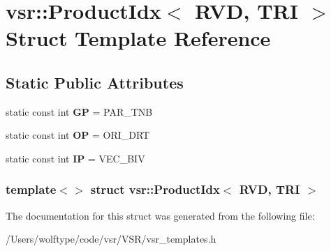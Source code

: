\hypertarget{structvsr_1_1_product_idx_3_01_r_v_d_00_01_t_r_i_01_4}{\section{vsr\-:\-:Product\-Idx$<$ R\-V\-D, T\-R\-I $>$ Struct Template Reference}
\label{structvsr_1_1_product_idx_3_01_r_v_d_00_01_t_r_i_01_4}
}
\subsection*{Static Public Attributes}
\begin{DoxyCompactItemize}
\item 
\hypertarget{structvsr_1_1_product_idx_3_01_r_v_d_00_01_t_r_i_01_4_adc46ffcfe6981c59f0d8f07e973c303c}{static const int {\bfseries G\-P} = P\-A\-R\-\_\-\-T\-N\-B}\label{structvsr_1_1_product_idx_3_01_r_v_d_00_01_t_r_i_01_4_adc46ffcfe6981c59f0d8f07e973c303c}

\item 
\hypertarget{structvsr_1_1_product_idx_3_01_r_v_d_00_01_t_r_i_01_4_ae7aa5ce81b28eb7d9a2a3931716cccc6}{static const int {\bfseries O\-P} = O\-R\-I\-\_\-\-D\-R\-T}\label{structvsr_1_1_product_idx_3_01_r_v_d_00_01_t_r_i_01_4_ae7aa5ce81b28eb7d9a2a3931716cccc6}

\item 
\hypertarget{structvsr_1_1_product_idx_3_01_r_v_d_00_01_t_r_i_01_4_a5d3b9e434625f575e26ebe41c0f52c49}{static const int {\bfseries I\-P} = V\-E\-C\-\_\-\-B\-I\-V}\label{structvsr_1_1_product_idx_3_01_r_v_d_00_01_t_r_i_01_4_a5d3b9e434625f575e26ebe41c0f52c49}

\end{DoxyCompactItemize}
\subsubsection*{template$<$$>$ struct vsr\-::\-Product\-Idx$<$ R\-V\-D, T\-R\-I $>$}



The documentation for this struct was generated from the following file\-:\begin{DoxyCompactItemize}
\item 
/\-Users/wolftype/code/vsr/\-V\-S\-R/vsr\-\_\-templates.\-h\end{DoxyCompactItemize}
